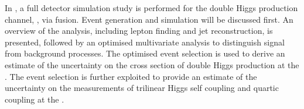 In , a full \CLICILD detector simulation study is performed for the double Higgs production channel, \eeToHH, via \WW fusion. Event generation and simulation will be discussed first. An overview of the analysis, including lepton finding and jet reconstruction, is presented, followed by an optimised multivariate analysis to distinguish signal from background processes. The optimised event selection is used to derive an estimate of the uncertainty on the cross section of double Higgs production at the \CLIC. The event selection is further exploited to provide an estimate of the uncertainty on the measurements of  trilinear Higgs self coupling and quartic coupling at the \CLIC.

